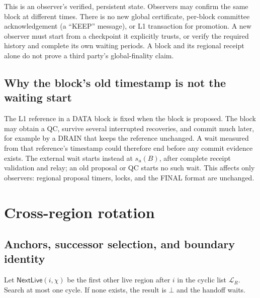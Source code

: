 \documentclass[11pt,a4paper]{article}
\newif\ifrevmarks
\newcommand{\Rv}[1]{\ifrevmarks\leavevmode{\color{rvBlue}#1}\else#1\fi}
\newcommand{\Cid}[1]{\ifrevmarks\textsuperscript{\hyperlink{chg:#1}{\color{rvBlue}\sffamily\scriptsize#1}}\fi}
\newcommand{\tagg}[1]{\ensuremath{\mathsf{#1}}}
\newcounter{protocol}
\begin{document}
This is an observer's verified, persistent state. Observers may confirm
the same block at different times. There is no new global certificate,
\Rv{per-block committee acknowledgement (a ``KEEP'' message),}
or L1 transaction for promotion. A new observer must
start from a checkpoint it explicitly trusts, or verify the required
history and complete its own waiting periods. A block and its regional
receipt alone do not prove a third party's global-finality claim.

\subsection{Why the block's old timestamp is not the waiting start}
\label{sec:late-receipt}
\Rv{The L1 reference in a DATA block is fixed when the block is
proposed. The block may obtain a QC, survive several interrupted
recoveries, and commit much later, for example by a DRAIN that keeps the
reference unchanged. A wait measured from that reference's timestamp
could therefore end before any commit evidence exists. The external wait
starts instead at $s_u(B)$, after complete receipt validation and relay;
an old proposal or QC starts no such wait. This affects only observers:
regional proposal timers, locks, and the FINAL format are unchanged.}

\section{Cross-region rotation}
\label{sec:xprotocols}

\subsection{Anchors, successor selection, and boundary identity}
\label{sec:witness}
Let $\tagg{NextLive}(i,\chi)$ be the first other live region after $i$
in the cyclic list $\mathcal L_R$. Search at most one cycle. If none
exists, the result is $\bot$ and the handoff waits.
\end{document}
